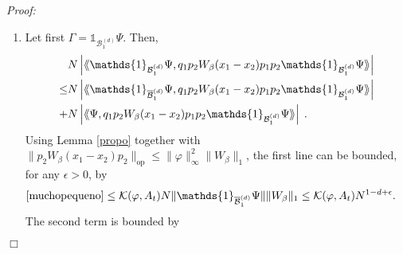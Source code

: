 \documentclass[11pt, english, american]{article}
\newcommand{\laa}{\langle\hspace{-0.08cm}\langle}
\newcommand{\raa}{\rangle\hspace{-0.08cm}\rangle}
\newenvironment{proof}{\emph{Proof:}}{\begin{flushright} $ \Box $ \end{flushright}}
\renewcommand{\phi}{\varphi}
\begin{document}
\begin{proof}



\begin{enumerate}
\item
Let first $\Gamma= \mathds{1}_{{\mathcal{B}_1^{(d)}}}  \Psi$.
Then,
\begin{align}
&N\left|\laa\mathds{1}_{{\mathcal{B}_1^{(d)}}}  \Psi, q_1p_2
W_\beta(x_1-x_2) p_1p_2 \mathds{1}_{{\mathcal{B}_1^{(d)}}}  \Psi\raa\right| 
\nonumber
 \\
\leq& 
\label{muchopequeno}
 N\left|\laa \mathds{1}_{{\overline{\mathcal{B}}^{(d)}_{1}}} \Psi, q_1p_2
W_\beta(x_1-x_2) p_1p_2 \mathds{1}_{{\mathcal{B}_1^{(d)}}}  \Psi\raa\right|  \\
\label{pequeno}
+& N\left|\laa \Psi, q_1p_2
W_\beta(x_1-x_2) p_1p_2 \mathds{1}_{{\mathcal{B}_1^{(d)}}}  \Psi\raa\right|  
\;.
\end{align}
Using Lemma \ref{propo}
together with $\|p_2 W_\beta (x_1-x_2) p_2 \|_{\text{op}} \leq \|\phi\|_\infty^2 \|W_\beta\|_1$,
 the first line can be bounded, for any $\epsilon>0$, by
\begin{align}
&
\eqref{muchopequeno}
\leq  \mathcal{K}(\phi, A_t) N  \| \mathds{1}_{{\overline{\mathcal{B}}^{(d)}_{1}}} \Psi \|
\| W_{\beta} \|_{1} \leq \mathcal{K}(\phi, A_t) N^{1- d + \epsilon}.
\end{align}
The second term is bounded by


\end{enumerate}
\end{proof}
\end{document}
